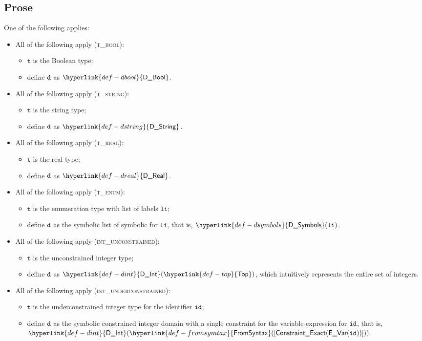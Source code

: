 \documentclass{book}
\newcommand\DBool[0]{\hyperlink{def-dbool}{\textsf{D\_Bool}}}
\newcommand\DString[0]{\hyperlink{def-dstring}{\textsf{D\_String}}}
\newcommand\DReal[0]{\hyperlink{def-dreal}{\textsf{D\_Real}}}
\newcommand\DSymbols[0]{\hyperlink{def-dsymbols}{\textsf{D\_Symbols}}}
\newcommand\DInt[0]{\hyperlink{def-dint}{\textsf{D\_Int}}}
\newcommand\Top[0]{\hyperlink{def-top}{\textsf{Top}}}
\newcommand\FromSyntax[0]{\hyperlink{def-fromsymtax}{\textsf{FromSyntax}}}
\newcommand\vt[0]{\texttt{t}}
\newcommand\vli[0]{\texttt{li}}
\begin{document}
\subsection{Prose}
One of the following applies:
\begin{itemize}
  \item All of the following apply (\textsc{t\_bool}):
  \begin{itemize}
    \item $\vt$ is the Boolean type;
    \item define $\texttt{d}$ as $\DBool$.
  \end{itemize}

  \item All of the following apply (\textsc{t\_string}):
  \begin{itemize}
    \item $\vt$ is the string type;
    \item define $\texttt{d}$ as $\DString$.
  \end{itemize}

  \item All of the following apply (\textsc{t\_real}):
  \begin{itemize}
    \item $\vt$ is the real type;
    \item define $\texttt{d}$ as $\DReal$.
  \end{itemize}

  \item All of the following apply (\textsc{t\_enum}):
  \begin{itemize}
    \item $\vt$ is the enumeration type with list of labels $\vli$;
    \item define $\texttt{d}$ as the symbolic list of symbolic for $\vli$, that is, $\DSymbols(\vli)$.
  \end{itemize}

  \item All of the following apply (\textsc{int\_unconstrained}):
  \begin{itemize}
    \item $\vt$ is the unconstrained integer type;
    \item define $\texttt{d}$ as $\DInt(\Top)$, which intuitively represents the entire set of integers.
  \end{itemize}

  \item All of the following apply (\textsc{int\_underconstrained}):
  \begin{itemize}
    \item $\vt$ is the underconstrained integer type for the identifier $\texttt{id}$;
    \item define $\texttt{d}$ as the symbolic constrained integer domain with a single constraint for the variable expression for $\texttt{id}$,
          that is, \\ $\DInt(\FromSyntax([\ConstraintExact(\EVar(\id))]))$.
  \end{itemize}


\end{itemize}
\end{document}

